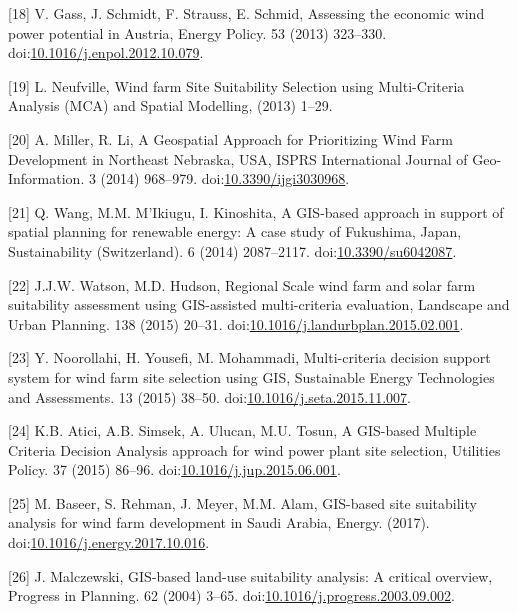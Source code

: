 \documentclass[a4paper,]{article}
\theoremstyle{definition}
\theoremstyle{definition}
\theoremstyle{definition}
\theoremstyle{remark}
\begin{document}
\hypertarget{ref-Gass2013}{}
{[}18{]} V. Gass, J. Schmidt, F. Strauss, E. Schmid, Assessing the
economic wind power potential in Austria, Energy Policy. 53 (2013)
323--330.
doi:\href{https://doi.org/10.1016/j.enpol.2012.10.079}{10.1016/j.enpol.2012.10.079}.

\hypertarget{ref-Neufville2013}{}
{[}19{]} L. Neufville, Wind farm Site Suitability Selection using
Multi-Criteria Analysis (MCA) and Spatial Modelling, (2013) 1--29.

\hypertarget{ref-Miller2014}{}
{[}20{]} A. Miller, R. Li, A Geospatial Approach for Prioritizing Wind
Farm Development in Northeast Nebraska, USA, ISPRS International Journal
of Geo-Information. 3 (2014) 968--979.
doi:\href{https://doi.org/10.3390/ijgi3030968}{10.3390/ijgi3030968}.

\hypertarget{ref-Wang2014}{}
{[}21{]} Q. Wang, M.M. M'Ikiugu, I. Kinoshita, A GIS-based approach in
support of spatial planning for renewable energy: A case study of
Fukushima, Japan, Sustainability (Switzerland). 6 (2014) 2087--2117.
doi:\href{https://doi.org/10.3390/su6042087}{10.3390/su6042087}.

\hypertarget{ref-Watson2015}{}
{[}22{]} J.J.W. Watson, M.D. Hudson, Regional Scale wind farm and solar
farm suitability assessment using GIS-assisted multi-criteria
evaluation, Landscape and Urban Planning. 138 (2015) 20--31.
doi:\href{https://doi.org/10.1016/j.landurbplan.2015.02.001}{10.1016/j.landurbplan.2015.02.001}.

\hypertarget{ref-Noorollahi2015}{}
{[}23{]} Y. Noorollahi, H. Yousefi, M. Mohammadi, Multi-criteria
decision support system for wind farm site selection using GIS,
Sustainable Energy Technologies and Assessments. 13 (2015) 38--50.
doi:\href{https://doi.org/10.1016/j.seta.2015.11.007}{10.1016/j.seta.2015.11.007}.

\hypertarget{ref-Atici2015}{}
{[}24{]} K.B. Atici, A.B. Simsek, A. Ulucan, M.U. Tosun, A GIS-based
Multiple Criteria Decision Analysis approach for wind power plant site
selection, Utilities Policy. 37 (2015) 86--96.
doi:\href{https://doi.org/10.1016/j.jup.2015.06.001}{10.1016/j.jup.2015.06.001}.

\hypertarget{ref-Baseer2017}{}
{[}25{]} M. Baseer, S. Rehman, J. Meyer, M.M. Alam, GIS-based site
suitability analysis for wind farm development in Saudi Arabia, Energy.
(2017).
doi:\href{https://doi.org/10.1016/j.energy.2017.10.016}{10.1016/j.energy.2017.10.016}.

\hypertarget{ref-Malczewski2004}{}
{[}26{]} J. Malczewski, GIS-based land-use suitability analysis: A
critical overview, Progress in Planning. 62 (2004) 3--65.
doi:\href{https://doi.org/10.1016/j.progress.2003.09.002}{10.1016/j.progress.2003.09.002}.
\end{document}

